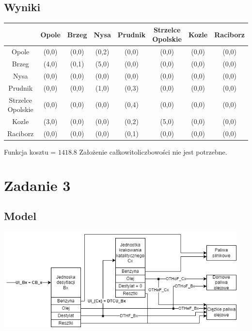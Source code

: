 \documentclass{article}
\begin{document}
\subsection{Wyniki}

\begin{center}
    \begin{tabular}{| c | c | c | c | c | c | c | c |}
        \hline
        &      Opole &         Brzeg &         Nysa &  Prudnik &       Strzelce Opolskie &     Kozle &         Raciborz\\ \hline
        Opole   & (0,0) & (0,0) & (0,2) & (0,0) & (0,0) & (0,0) & (0,0) \\ \hline
        Brzeg   & (4,0) & (0,1) & (5,0) & (0,0) & (0,0) & (0,0) & (0,0) \\ \hline
        Nysa    & (0,0) & (0,0) & (0,0) & (0,0) & (0,0) & (0,0) & (0,0) \\ \hline
        Prudnik & (0,0) & (0,0) & (1,0) & (0,3) & (0,0) & (0,0) & (0,0) \\ \hline
        Strzelce Opolskie       & (0,0) & (0,0) & (0,0) & (0,4) & (0,0) & (0,0) & (0,0) \\ \hline
        Kozle   & (3,0) & (0,0) & (0,0) & (0,2) & (5,0) & (0,0) & (0,0) \\ \hline
        Raciborz        & (0,0) & (0,0) & (0,0) & (0,1) & (0,0) & (0,0) & (0,0) \\ \hline
    \end{tabular}
\end{center}

Funkcja kosztu = $1418.8$
Założenie całkowitoliczbowości nie jest potrzebne.

\section{Zadanie 3}
\subsection{Model}
\begin{center}
    \includegraphics[width = 5in]{model.png}
\end{center}
\end{document}
